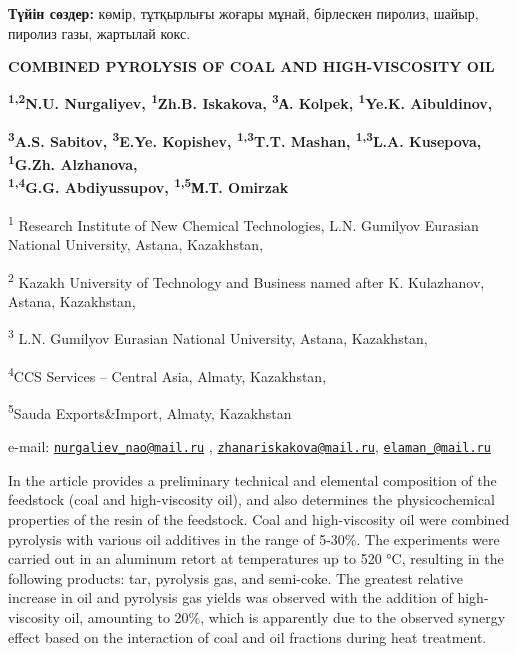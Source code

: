 {\bfseries Түйін сөздер:} көмір, тұтқырлығы жоғары мұнай, бірлескен
пиролиз, шайыр, пиролиз газы, жартылай кокс.

\begin{articleheader}
{\bfseries COMBINED PYROLYSIS OF COAL AND HIGH-VISCOSITY OIL}

{\bfseries \textsuperscript{1,2}N.U. Nurgaliyev\textsuperscript{\envelope },
\textsuperscript{1}Zh.B. Iskakova\textsuperscript{\envelope },
\textsuperscript{3}А. Kolpek, \textsuperscript{1}Ye.K.
Aibuldinov\textsuperscript{\envelope },}

{\bfseries \textsuperscript{3}A.S. Sabitov, \textsuperscript{3}E.Ye.
Kopishev, \textsuperscript{1,3}T.T. Mashan, \textsuperscript{1,3}L.A.
Kusepova, \textsuperscript{1}G.Zh. Alzhanova,\\
\textsuperscript{1,4}G.G. Abdiyussupov, \textsuperscript{1,5}М.Т.
Omirzak}
\end{articleheader}

\begin{affiliation}
\textsuperscript{1} Research Institute of New Chemical Technologies,
L.N. Gumilyov Eurasian National University, Astana, Kazakhstan,

\textsuperscript{2} Kazakh University of Technology and Business named
after K. Kulazhanov, Astana, Kazakhstan,

\textsuperscript{3} L.N. Gumilyov Eurasian National University, Astana,
Kazakhstan,

\textsuperscript{4}CCS Services -- Central Asia, Almaty, Kazakhstan,

\textsuperscript{5}Sauda Exports\&Import, Almaty, Kazakhstan

e-mail:
\href{mailto:nurgaliev_nao@mail.ru}{\nolinkurl{nurgaliev\_nao@mail.ru}}
,
\href{mailto:zhanariskakova@mail.ru}{\nolinkurl{zhanariskakova@mail.ru}},
\href{mailto:elaman_@mail.ru}{\nolinkurl{elaman\_@mail.ru}}
\end{affiliation}

In the article provides a preliminary technical and elemental
composition of the feedstock (coal and high-viscosity oil), and also
determines the physicochemical properties of the resin of the feedstock.
Coal and high-viscosity oil were combined pyrolysis with various oil
additives in the range of 5-30\%. The experiments were carried out in an
aluminum retort at temperatures up to 520 °C, resulting in the following
products: tar, pyrolysis gas, and semi-coke. The greatest relative
increase in oil and pyrolysis gas yields was observed with the addition
of high-viscosity oil, amounting to 20\%, which is apparently due to the
observed synergy effect based on the interaction of coal and oil
fractions during heat treatment.

